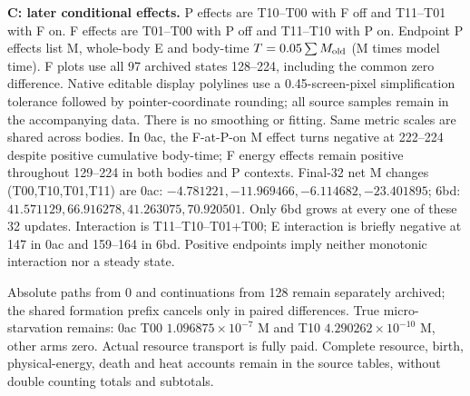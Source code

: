 \textbf{C: later conditional effects.} P effects are T10--T00 with F off and T11--T01 with F on. F effects are T01--T00 with P off and T11--T10 with P on. Endpoint P effects list M, whole-body E and body-time $T=0.05\sum M_{\rm old}$ (M times model time). F plots use all 97 archived states 128--224, including the common zero difference. Native editable display polylines use a 0.45-screen-pixel simplification tolerance followed by pointer-coordinate rounding; all source samples remain in the accompanying data. There is no smoothing or fitting. Same metric scales are shared across bodies. In 0ac, the F-at-P-on M effect turns negative at 222--224 despite positive cumulative body-time; F energy effects remain positive throughout 129--224 in both bodies and P contexts. Final-32 net M changes (T00,T10,T01,T11) are 0ac: $-4.781221,-11.969466,-6.114682,-23.401895$; 6bd: $41.571129,66.916278,41.263075,70.920501$. Only 6bd grows at every one of these 32 updates. Interaction is T11--T10--T01+T00; E interaction is briefly negative at 147 in 0ac and 159--164 in 6bd. Positive endpoints imply neither monotonic interaction nor a steady state.

Absolute paths from 0 and continuations from 128 remain separately archived; the shared formation prefix cancels only in paired differences. True micro-starvation remains: 0ac T00 $1.096875\times10^{-7}$ M and T10 $4.290262\times10^{-10}$ M, other arms zero. Actual resource transport is fully paid. Complete resource, birth, physical-energy, death and heat accounts remain in the source tables, without double counting totals and subtotals.
